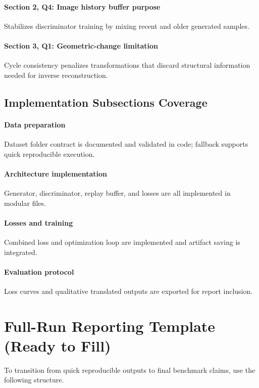 \documentclass[conference]{IEEEtran}
\begin{document}
\paragraph{Section 2, Q4: Image history buffer purpose}
Stabilizes discriminator training by mixing recent and older generated samples.

\paragraph{Section 3, Q1: Geometric-change limitation}
Cycle consistency penalizes transformations that discard structural information needed for inverse reconstruction.

\subsection{Implementation Subsections Coverage}
\paragraph{Data preparation}
Dataset folder contract is documented and validated in code; fallback supports quick reproducible execution.

\paragraph{Architecture implementation}
Generator, discriminator, replay buffer, and losses are all implemented in modular files.

\paragraph{Losses and training}
Combined loss and optimization loop are implemented and artifact saving is integrated.

\paragraph{Evaluation protocol}
Loss curves and qualitative translated outputs are exported for report inclusion.

\section{Full-Run Reporting Template (Ready to Fill)}
To transition from quick reproducible outputs to final benchmark claims, use the following structure.
\end{document}
